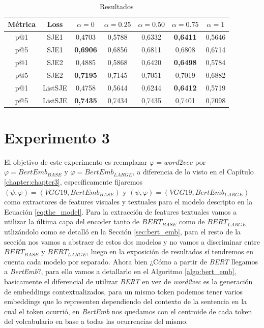 \begin{table}[ht]
    \centering
    \begin{tabular}{|c|c|c|c|c|c|c|}
        \hline
        \textbf{Métrica} &
        \textbf{Loss} &
        \textbf{$\alpha = 0$} &
        \textbf{$\alpha = 0.25$} &
        \textbf{$\alpha = 0.50$} &
        \textbf{$\alpha = 0.75$} &
        \textbf{$\alpha = 1$}\\
        \hline \hline
        p@1 & SJE1 & 0,4703 & 0,5788 & 0,6332 & \textbf{0,6411} & 0,5646 \\
        p@5 & SJE1 & \textbf{0,6906} & 0,6856 & 0,6811 & 0,6808 & 0,6714 \\
        p@1 & SJE2 & 0,4885 & 0,5868 & 0,6420 & \textbf{0,6498} & 0,5784 \\
        p@5 & SJE2 & \textbf{0,7195} & 0,7145 & 0,7051 & 0,7019 & 0,6882 \\
        p@1 & ListSJE & 0,4758 & 0,5644 & 0,6244 & \textbf{0,6412} & 0,5719 \\
        p@5 & ListSJE & \textbf{0,7435} & 0,7434 & 0,7435 & 0,7401 & 0,7098\\
        \hline
    \end{tabular}
    \caption{Resultados}
    \label{tab:results_exp2}
\end{table}


\section{Experimento 3}

El objetivo de este experimento es reemplazar $\varphi = \textit{word2vec}$ por $ \varphi = \textit{BertEmb}_{BASE}$ y $\varphi = \textit{BertEmb}_{LARGE}$, a diferencia de lo visto en el Capítulo \ref{chapter:chapter3}, específicamente fijaremos $(\psi, \varphi) = (VGG19, BertEmb_{BASE})$ y $(\psi, \varphi) = (VGG19, BertEmb_{LARGE})$ como extractores de features visuales y textuales para el modelo descripto en la Ecuación \ref{eq:the_model}. Para la extracción de features textuales vamos a utilizar la última capa del encoder tanto de $\textit{BERT}_{BASE}$ como de $\textit{BERT}_{LARGE}$ utlizándolo como se detalló en la Sección \ref{sec:bert_emb}, para el resto de la sección nos vamos a abstraer de estos dos modelos y no vamos a discriminar entre $\textit{BERT}_{BASE}$ y $\textit{BERT}_{LARGE}$, luego en la exposición de resultados sí tendremos en cuenta cada modelo por separado. Ahora bien ¿Cómo a partir de \textit{BERT} llegamos a \textit{BertEmb}?, para ello vamos a detallarlo en el Algoritmo \ref{algo:bert_emb}, basicamente el diferencial de utilizar \textit{BERT} en vez de \textit{word2vec} es la generación de embeddings contextualizados, para un mismo token podemos tener varios embeddings que lo representen dependiendo del contexto de la sentencia en la cual el token ocurrió, en \textit{BertEmb} nos quedamos con el centroide de cada token del volcabulario en base a todas las ocurrencias del mismo.

